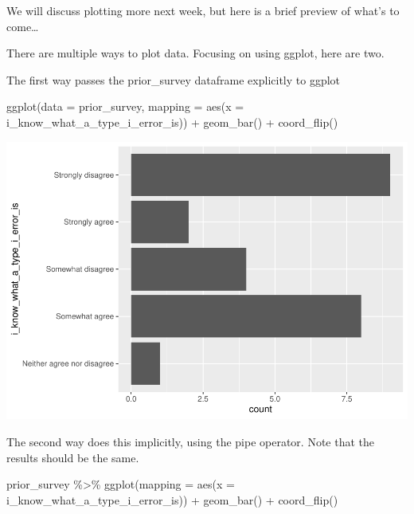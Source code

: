\documentclass[
]{book}
\newenvironment{Shaded}{\begin{snugshade}}{\end{snugshade}}
\newcommand{\AttributeTok}[1]{\textcolor[rgb]{0.77,0.63,0.00}{#1}}
\newcommand{\FunctionTok}[1]{\textcolor[rgb]{0.00,0.00,0.00}{#1}}
\newcommand{\NormalTok}[1]{#1}
\newcommand{\SpecialCharTok}[1]{\textcolor[rgb]{0.00,0.00,0.00}{#1}}
\begin{document}
We will discuss plotting more next week, but here is a brief preview of what's to come\ldots{}

There are multiple ways to plot data. Focusing on using ggplot, here are two.

The first way passes the prior\_survey dataframe explicitly to ggplot

\begin{Shaded}
\begin{Highlighting}[]
\FunctionTok{ggplot}\NormalTok{(}\AttributeTok{data =}\NormalTok{ prior\_survey, }\AttributeTok{mapping =} \FunctionTok{aes}\NormalTok{(}\AttributeTok{x =}\NormalTok{ i\_know\_what\_a\_type\_i\_error\_is)) }\SpecialCharTok{+}
  \FunctionTok{geom\_bar}\NormalTok{() }\SpecialCharTok{+}
  \FunctionTok{coord\_flip}\NormalTok{()}
\end{Highlighting}
\end{Shaded}

\includegraphics{test_course_notes_files/figure-latex/unnamed-chunk-12-1.pdf}

The second way does this implicitly, using the pipe operator. Note that the results should be the same.

\begin{Shaded}
\begin{Highlighting}[]
\NormalTok{prior\_survey }\SpecialCharTok{\%\textgreater{}\%} 
  \FunctionTok{ggplot}\NormalTok{(}\AttributeTok{mapping =} \FunctionTok{aes}\NormalTok{(}\AttributeTok{x =}\NormalTok{ i\_know\_what\_a\_type\_i\_error\_is)) }\SpecialCharTok{+}
  \FunctionTok{geom\_bar}\NormalTok{() }\SpecialCharTok{+}
  \FunctionTok{coord\_flip}\NormalTok{()}
\end{Highlighting}
\end{Shaded}
\end{document}
